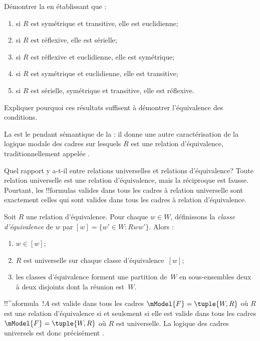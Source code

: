\documentclass[../../../include/open-logic-section]{subfiles}
\begin{document}
\begin{prob}
  Démontrer la  en établissant que :
  \begin{enumerate}
  \item si $R$ est symétrique et transitive, elle est euclidienne;
  \item si $R$ est réflexive, elle est sérielle;
  \item si $R$ est réflexive et euclidienne, elle est symétrique;
  \item si $R$ est symétrique et euclidienne, elle est transitive;
  \item si $R$ est sérielle, symétrique et transitive, elle est réflexive.
  \end{enumerate}
  Expliquer pourquoi ces résultats suffisent à démontrer l'équivalence
  des conditions.
\end{prob}

La  est le pendant sémantique de la
 : il donne une autre caractérisation de la
logique modale des cadres sur lesquels $R$ est une relation
d'équivalence, traditionnellement appelée .

Quel rapport y a-t-il entre relations universelles et relations
d'équivalence? Toute relation universelle est une relation
d'équivalence, mais la réciproque est fausse. Pourtant, les !!{formula}s
valides dans tous les cadres à relation universelle sont exactement
celles qui sont valides dans tous les cadres à relation d'équivalence.

\begin{prop}
  Soit $R$ une relation d'équivalence. Pour chaque $w \in W$,
  définissons la \emph{classe d'équivalence} de $w$ par
  $[w] = \{w'\in W : Rww'\}$. Alors :
  \begin{enumerate}
  \item $w \in [w]$;
  \item $R$ est universelle sur chaque classe d'équivalence~$[w]$;
  \item les classes d'équivalence forment une partition de~$W$ en
    sous-ensembles deux à deux disjoints dont la réunion est~$W$.
  \end{enumerate}
\end{prop}

\begin{prop}
  !!^a{formula}~$!A$ est valide dans tous les cadres
  $\mModel{F} =\tuple{W,R}$ où $R$ est une relation d'équivalence si et
  seulement si elle est valide dans tous les cadres
  $\mModel{F} =\tuple{W,R}$ où $R$ est universelle. La logique des
  cadres universels est donc précisément .
\end{prop}
\end{document}
